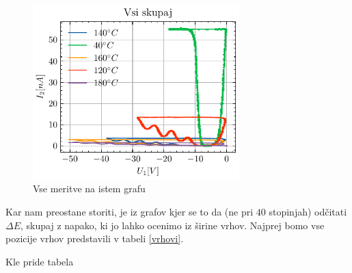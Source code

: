 \documentclass[10pt]{article}
\begin{document}
\begin{figure}[h]
    \begin{center}
        \includegraphics[width=8cm]{vsi.pdf}
        \caption{Vse meritve na istem grafu}
        \label{vsi}
    \end{center}
\end{figure}


Kar nam preostane storiti, je iz grafov kjer se to da (ne pri $40$ stopinjah) odčitati $\Delta E$, skupaj z napako, ki jo lahko ocenimo iz širine vrhov. Najprej bomo vse pozicije vrhov predstavili v tabeli \ref{vrhovi}.

Kle pride tabela
\end{document}
